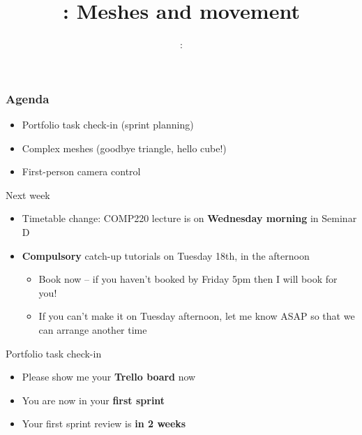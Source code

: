 \usepackage{../../beamerthemeFalmouthGamesAcademy}
\usepackage{multimedia}
\graphicspath{ {../../} }


\usepackage[normalem]{ulem}
\usepackage{wasysym}

\usepackage{pdfpages}

\usetikzlibrary{arrows,automata}




\title{\sessionnumber: Meshes and movement}
\subtitle{\modulecode: \moduletitle}

\frame{\titlepage} 

\begin{frame}
	\frametitle{Agenda}
	\begin{itemize}
		\item Portfolio task check-in (sprint planning)
		\item Complex meshes (goodbye triangle, hello cube!)
		\item First-person camera control
	\end{itemize}
\end{frame}

\begin{frame}{Next week}
	\begin{itemize}
		\pause\item Timetable change: COMP220 lecture is on \textbf{Wednesday morning} in Seminar D
		\pause\item \textbf{Compulsory} catch-up tutorials on Tuesday 18th, in the afternoon
			\begin{itemize}
				\pause\item Book now -- if you haven't booked by Friday 5pm then I will book for you!
				\pause\item If you can't make it on Tuesday afternoon, let me know ASAP so that we can arrange another time
			\end{itemize}
	\end{itemize}
\end{frame}

\begin{frame}{Portfolio task check-in}
	\begin{itemize}
		\pause\item Please show me your \textbf{Trello board} now
		\pause\item You are now in your \textbf{first sprint}
		\pause\item Your first sprint review is \textbf{in 2 weeks}
	\end{itemize}
\end{frame}





